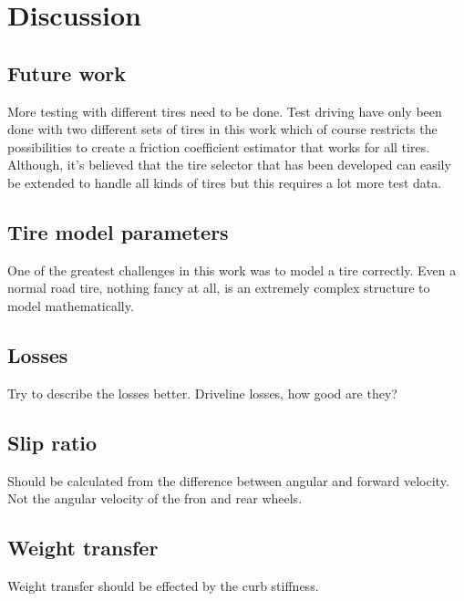 \chapter{Discussion}

\section{Future work}
More testing with different tires need to be done. Test driving have only been done with two different sets of tires in this work which of course restricts the possibilities to create a friction coefficient estimator that works for all tires. Although, it's believed that the tire selector that has been developed can easily be extended to handle all kinds of tires but this requires a lot more test data.

\section{Tire model parameters}
One of the greatest challenges in this work was to model a tire correctly. Even a normal road tire, nothing fancy at all, is an extremely complex structure to model mathematically. 
\section{Losses}
Try to describe the losses better. Driveline losses, how good are they?

\section{Slip ratio}
Should be calculated from the difference between angular and forward velocity. Not the angular velocity of the fron and rear wheels. 


\section{Weight transfer}
Weight transfer should be effected by the curb stiffness. 